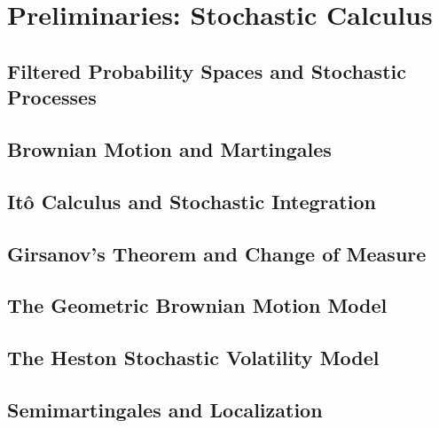 
\section{Preliminaries: Stochastic Calculus}
\label{sec:preliminaries}


\subsection{Filtered Probability Spaces and Stochastic Processes}
\label{subsec:prob_spaces}


\subsection{Brownian Motion and Martingales}
\label{subsec:brownian_martingales}


\subsection{Itô Calculus and Stochastic Integration}
\label{subsec:ito_calculus}


\subsection{Girsanov's Theorem and Change of Measure}
\label{subsec:girsanov}


\subsection{The Geometric Brownian Motion Model}
\label{subsec:gbm_model}


\subsection{The Heston Stochastic Volatility Model}
\label{subsec:heston_model}


\subsection{Semimartingales and Localization}
\label{subsec:semimartingales}


